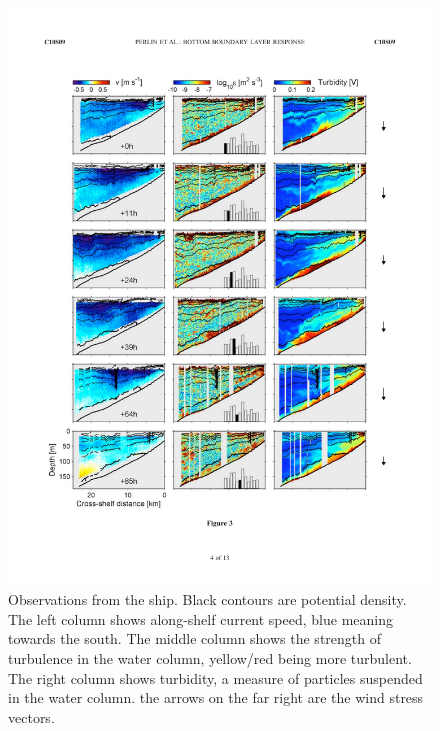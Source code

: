 \begin{figure}[hbt]
  \begin{center}
  \includegraphics{figs/WindOverview/PerlinFig3a}
    \caption{Observations from the ship.  Black contours are potential density.  The left column shows along-shelf current speed, blue meaning towards the south.  The middle column shows the strength of turbulence in the water column, yellow/red being more turbulent.  The right column shows turbidity, a measure of particles suspended in the water column.  the arrows on the far right are the wind stress vectors.}
    \label{fig:PerlinFig3a}  
  \end{center}
\end{figure}

